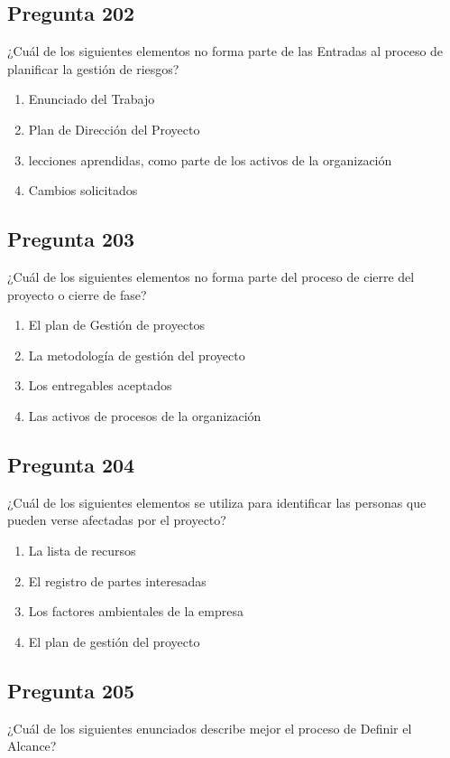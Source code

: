 \documentclass[11pt,a4paper]{article}
\begin{document}
\subsection*{Pregunta 202}
¿Cuál de los siguientes elementos no forma parte de las Entradas al proceso de planificar la gestión de riesgos?

\begin{enumerate}[label=\alph*)]
  \item Enunciado del Trabajo
  \item Plan de Dirección del Proyecto
  \item lecciones aprendidas, como parte de los activos de la organización
  \item Cambios solicitados
\end{enumerate}

\subsection*{Pregunta 203}
¿Cuál de los siguientes elementos no forma parte del proceso de cierre del proyecto o cierre de fase?

\begin{enumerate}[label=\alph*)]
  \item El plan de Gestión de proyectos
  \item La metodología de gestión del proyecto
  \item Los entregables aceptados
  \item Las activos de procesos de la organización
\end{enumerate}

\subsection*{Pregunta 204}
¿Cuál de los siguientes elementos se utiliza para identificar las personas que pueden verse afectadas por el proyecto?

\begin{enumerate}[label=\alph*)]
  \item La lista de recursos
  \item El registro de partes interesadas
  \item Los factores ambientales de la empresa
  \item El plan de gestión del proyecto
\end{enumerate}

\subsection*{Pregunta 205}
¿Cuál de los siguientes enunciados describe mejor el proceso de Definir el Alcance?
\end{document}
